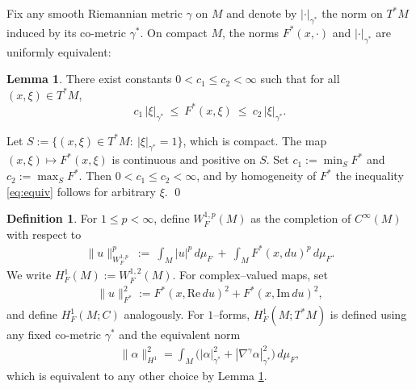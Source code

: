 \documentclass[fleqn,11pt,twoside]{article}
\makeatletter
\renewenvironment{proof}[1][\proofname]{\par
  \normalfont
  \topsep6\p@\@plus6\p@ \trivlist
  \item[\hskip\labelsep\textbf{%
    #1\@addpunct{.}}]\ignorespaces
}{%
  \qed\endtrivlist
}
\theoremstyle{definition}
\newtheorem*{definition}{Definition}
\newtheorem{lemma}{Lemma}
\makeatother
\begin{document}

Fix any smooth Riemannian metric $\gamma$ on $M$ and denote by $|\cdot|_{\gamma^*}$ the norm on $T^*M$ induced by its co-metric $\gamma^*$. On compact $M$, the norms $F^*(x,\cdot)$ and $|\cdot|_{\gamma^*}$ are uniformly equivalent:

\begin{lemma}\label{lem:equivalence}
There exist constants $0<c_1\le c_2<\infty$ such that for all $(x,\xi)\in T^*M$,
\begin{equation}\label{eq:equiv}
   c_1\,|\xi|_{\gamma^*}\ \le\ F^*(x,\xi)\ \le\ c_2\,|\xi|_{\gamma^*}.
\end{equation}
\end{lemma}

\begin{proof}
Let $S:=\{(x,\xi)\in T^*M:\ |\xi|_{\gamma^*}=1\}$, which is compact. The map $(x,\xi)\mapsto F^*(x,\xi)$ is continuous and positive on $S$. Set $c_1:=\min_S F^*$ and $c_2:=\max_S F^*$. Then $0<c_1\le c_2<\infty$, and by homogeneity of $F^*$ the inequality \eqref{eq:equiv} follows for arbitrary $\xi$.
\end{proof}

\begin{definition}\label{def:sobolev}
For $1\le p<\infty$, define $W^{1,p}_F(M)$ as the completion of $C^\infty(M)$ with respect to
\begin{align*}
\|u\|_{W^{1,p}_F}^p\ :=\ \int_M |u|^p\, d\mu_F\ +\ \int_M F^*(x,du)^p\, d\mu_F.
\end{align*}
We write $H^1_F(M):=W^{1,2}_F(M)$. For complex--valued maps, set
\begin{align*}
\|u\|_{F^*}^2:=F^*(x,\mathrm{Re}\,du)^2+F^*(x,\mathrm{Im}\,du)^2,
\end{align*}
and define $H^1_F(M;C)$ analogously.
For $1$--forms, $H^1_F(M;T^*M)$ is defined using any fixed co-metric $\gamma^*$ and the equivalent norm
\begin{align*}
\|\alpha\|_{H^1}^2=\int_M \big(|\alpha|_{\gamma^*}^2+|\nabla^\gamma\alpha|_{\gamma^*}^2\big)\,d\mu_F,
\end{align*}
which is equivalent to any other choice by Lemma \ref{lem:equivalence}.
\end{definition}
\end{document}
